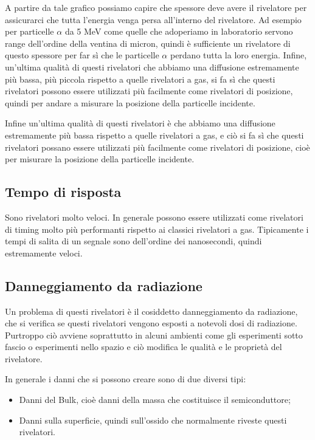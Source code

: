 \begin{esempio}
\begin{minipage}{0.39\textwidth}
\begin{figure}[H]
      \end{figure}
   \end{minipage}
   \begin{minipage}{0.6\textwidth}
      A partire da tale grafico possiamo capire che spessore deve avere il rivelatore per assicurarci che tutta l'energia venga persa all'interno del rivelatore. Ad esempio per particelle $\alpha$ da 5 MeV come quelle che adoperiamo in laboratorio servono range dell'ordine della ventina di micron, quindi è sufficiente un rivelatore di questo spessore per far sì che le particelle $\alpha$ perdano tutta la loro energia. Infine, un'ultima qualità di questi rivelatori che abbiamo una diffusione estremamente più bassa, più piccola rispetto a quelle rivelatori a gas, si fa sì che questi rivelatori possono essere utilizzati più facilmente come rivelatori di posizione, quindi per andare a misurare la posizione della particelle incidente.
   \end{minipage}
\end{esempio}

Infine un'ultima qualità di questi rivelatori è che abbiamo una diffusione estremamente più bassa rispetto a quelle rivelatori a gas, e ciò si fa sì che questi rivelatori possano essere utilizzati più facilmente come rivelatori di posizione, cioè per misurare la posizione della particelle incidente.

\subsection{Tempo di risposta}

Sono rivelatori molto veloci. In generale possono essere utilizzati come rivelatori di timing molto più performanti rispetto ai classici rivelatori a gas. Tipicamente i tempi di salita di un segnale sono dell'ordine dei nanosecondi, quindi estremamente veloci.

\subsection{Danneggiamento da radiazione}
Un problema di questi rivelatori è il cosiddetto danneggiamento da radiazione, che si verifica se questi rivelatori vengono esposti a notevoli dosi di radiazione. Purtroppo ciò avviene soprattutto in alcuni ambienti come gli esperimenti sotto fascio o esperimenti nello spazio e ciò modifica le qualità e le proprietà del rivelatore.

In generale i danni che si possono creare sono di due diversi tipi:
\begin{itemize}
   \item Danni del Bulk, cioè danni della massa che costituisce il semiconduttore;
   \item Danni sulla superficie, quindi sull'ossido che normalmente riveste questi rivelatori.
\end{itemize}

